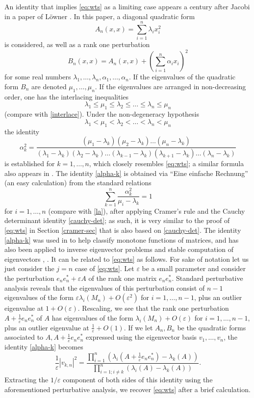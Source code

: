 \documentclass{amsart}
\newcommand\eps{\varepsilon}
\begin{document}
An identity that implies \eqref{eq:wts} as a limiting case appears a century after Jacobi in a paper of L\"owner \cite[(7)]{Lowner}.  In this paper, a diagonal quadratic form
$$ A_n(x,x) = \sum_{i=1}^n \lambda_i x_i^2$$
is considered, as well as a rank one perturbation
$$ B_n(x,x) = A_n(x,x) + \left( \sum_{i=1}^n \alpha_i x_i \right)^2$$
for some real numbers $\lambda_1,\dots,\lambda_n,\alpha_1,\dots,\alpha_n$.  If the eigenvalues of the quadratic form $B_n$ are denoted $\mu_1,\dots,\mu_n$. If the eigenvalues are arranged in non-decreasing order, one has the interlacing inequalities
$$\lambda_1 \leq \mu_1 \leq \lambda_2 \leq \dots \leq \lambda_n \leq \mu_n$$
(compare with \eqref{interlace}).  Under the non-degeneracy hypothesis
$$\lambda_1 < \mu_1 < \lambda_2 < \dots < \lambda_n < \mu_n$$
the identity
\begin{equation}\label{alpha-k}
 \alpha_k^2 = \frac{(\mu_1-\lambda_k) (\mu_2 - \lambda_k) \dots (\mu_n - \lambda_k)}{(\lambda_1-\lambda_k) (\lambda_2 - \lambda_k) \dots (\lambda_{k-1} - \lambda_k) (\lambda_{k+1} - \lambda_k) \dots (\lambda_n - \lambda_k)}
\end{equation}
is established for $k=1,\dots,n$, which closely resembles \eqref{eq:wts}; a similar formula also appears in \cite[\S 12]{jacobi}.  The identity \eqref{alpha-k} is obtained via ``Eine einfache Rechnung'' (an easy calculation) from the standard relations
$$ \sum_{k=1}^n \frac{\alpha_k^2}{\mu_i - \lambda_k} = 1$$
for $i=1,\dots,n$ (compare with \eqref{la}), after applying Cramer's rule and the Cauchy determinant identity \eqref{cauchy-det}; as such, it is very similar to the proof of \eqref{eq:wts} in Section \ref{cramer-sec} that is also based on \eqref{cauchy-det}.   The identity \eqref{alpha-k} was used in \cite{Lowner} to help classify monotone functions of matrices, and has also been applied to inverse eigenvector problems and stable computation of eigenvectors \cite{GE}, \cite[p. 224-226]{demmel}.  It can be related to \eqref{eq:wts} as follows.  For sake of notation let us just consider the $j=n$ case of \eqref{eq:wts}.  Let $\eps$ be a small parameter and consider the perturbation $e_n e_n^* + \eps A$ of the rank one matrix $e_n e_n^*$.  Standard perturbative analysis reveals that the eigenvalues of this perturbation consist of $n-1$ eigenvalues of the form $\eps \lambda_i(M_n) + O(\eps^2)$ for $i=1,\dots,n-1$, plus an outlier eigenvalue at $1+O(\eps)$.  Rescaling, we see that the rank one perturbation $A + \frac{1}{\eps} e_n e_n^*$ of $A$ has eigenvalues of the form $\lambda_i(M_n) + O(\eps)$ for $i=1,\dots,n-1$, plus an outlier eigenvalue at $\frac{1}{\eps}+O(1)$.  If we let $A_n, B_n$ be the quadratic forms associated to $A, A + \frac{1}{\eps} e_n e_n^*$ expressed using the eigenvector basis $v_1,\dots,v_n$, the identity \eqref{alpha-k} becomes
$$ \frac{1}{\eps} |v_{k,n}|^2 = \frac{\prod_{i=1}^n (\lambda_i( A + \frac{1}{\eps} e_n e_n^* ) - \lambda_k(A))}{\prod_{i=1; i \neq k}^n (\lambda_i(A) - \lambda_k(A))}.$$
Extracting the $1/\eps$ component of both sides of this identity using the aforementioned perturbative analysis, we recover \eqref{eq:wts} after a brief calculation.
\end{document}
